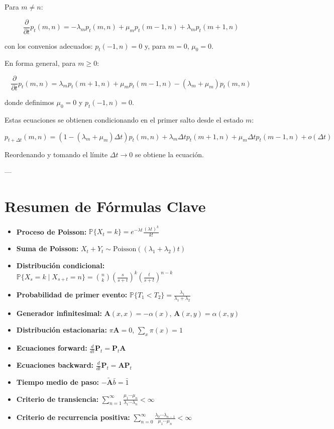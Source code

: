 \documentclass{article}
\theoremstyle{definition}
\newcommand{\Prob}{\mathbb{P}}
\newcommand{\A}{\mathbf{A}}
\newcommand{\PP}{\mathbf{P}}
\begin{document}
Para $m \neq n$:

\[
\frac{\partial}{\partial t} p_t(m,n) = -\lambda_m p_t(m,n) + \mu_m p_t(m-1,n) + \lambda_m p_t(m+1,n)
\]

con los convenios adecuados: $p_t(-1,n) = 0$ y, para $m=0$, $\mu_0 = 0$.

En forma general, para $m \geq 0$:

\[
\frac{\partial}{\partial t} p_t(m,n) = \lambda_m p_t(m+1,n) + \mu_m p_t(m-1,n) - (\lambda_m + \mu_m)p_t(m,n)
\]

donde definimos $\mu_0 = 0$ y $p_t(-1,n) = 0$.

Estas ecuaciones se obtienen condicionando en el primer salto desde el estado $m$:

\[
p_{t+\Delta t}(m,n) = (1 - (\lambda_m+\mu_m)\Delta t)p_t(m,n) + \lambda_m \Delta t p_t(m+1,n) + \mu_m \Delta t p_t(m-1,n) + o(\Delta t)
\]

Reordenando y tomando el límite $\Delta t \to 0$ se obtiene la ecuación.

---

\section*{Resumen de Fórmulas Clave}

\begin{itemize}
    \item \textbf{Proceso de Poisson:} $\Prob\{X_t = k\} = e^{-\lambda t} \frac{(\lambda t)^k}{k!}$
    \item \textbf{Suma de Poisson:} $X_t + Y_t \sim \text{Poisson}((\lambda_1+\lambda_2)t)$
    \item \textbf{Distribución condicional:} $\Prob\{X_s = k \mid X_{s+t} = n\} = \binom{n}{k} \left(\frac{s}{s+t}\right)^k \left(\frac{t}{s+t}\right)^{n-k}$
    \item \textbf{Probabilidad de primer evento:} $\Prob\{T_1 < T_2\} = \frac{\lambda_1}{\lambda_1+\lambda_2}$
    \item \textbf{Generador infinitesimal:} $\A(x,x) = -\alpha(x)$, $\A(x,y) = \alpha(x,y)$
    \item \textbf{Distribución estacionaria:} $\pi\A = 0$, $\sum_x \pi(x) = 1$
    \item \textbf{Ecuaciones forward:} $\frac{d}{dt}\PP_t = \PP_t\A$
    \item \textbf{Ecuaciones backward:} $\frac{d}{dt}\PP_t = \A\PP_t$
    \item \textbf{Tiempo medio de paso:} $-\tilde{\A}\bar{b} = \bar{1}$
    \item \textbf{Criterio de transiencia:} $\sum_{n=1}^\infty \frac{\mu_1\cdots\mu_n}{\lambda_1\cdots\lambda_n} < \infty$
    \item \textbf{Criterio de recurrencia positiva:} $\sum_{n=0}^\infty \frac{\lambda_0\cdots\lambda_{n-1}}{\mu_1\cdots\mu_n} < \infty$
\end{itemize}
\end{document}
